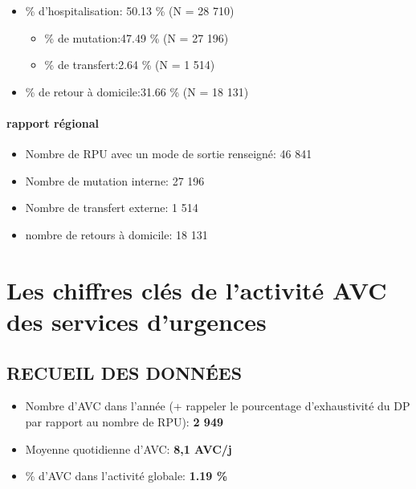 \documentclass[]{article}
\begin{document}
\begin{itemize}
\itemsep1pt\parskip0pt
\item
  \% d'hospitalisation: 50.13 \% (N = 28 710)

  \begin{itemize}
  \itemsep1pt\parskip0pt
  \item
    \% de mutation:47.49 \% (N = 27 196)
  \item
    \% de transfert:2.64 \% (N = 1 514)
  \end{itemize}
\item
  \% de retour à domicile:31.66 \% (N = 18 131)
\end{itemize}

\paragraph{rapport régional}\label{rapport-regional}

\begin{itemize}
\itemsep1pt\parskip0pt
\item
  Nombre de RPU avec un mode de sortie renseigné: 46 841
\item
  Nombre de mutation interne: 27 196
\item
  Nombre de transfert externe: 1 514
\item
  nombre de retours à domicile: 18 131
\end{itemize}

\section{Les chiffres clés de l'activité AVC des services
d'urgences}\label{les-chiffres-cles-de-lactivite-avc-des-services-durgences}

\subsection{RECUEIL DES DONNÉES}\label{recueil-des-donnees-3}

\begin{itemize}
\itemsep1pt\parskip0pt
\item
  Nombre d'AVC dans l'année (+ rappeler le pourcentage d'exhaustivité du
  DP par rapport au nombre de RPU): \textbf{2 949}
\item
  Moyenne quotidienne d'AVC: \textbf{8,1 AVC/j}
\item
  \% d'AVC dans l'activité globale: \textbf{1.19 \%}
\end{itemize}
\end{document}
